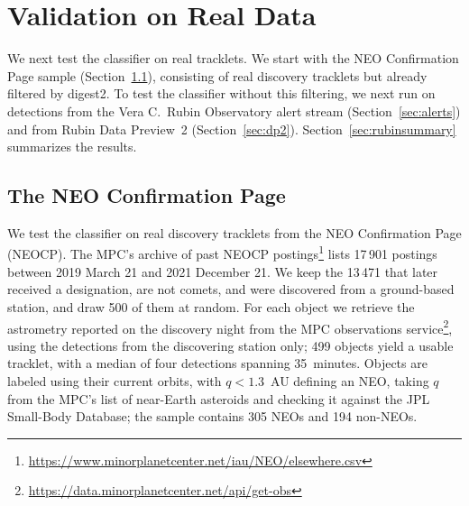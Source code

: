 \documentclass[linenumbers,twocolumn]{aastex701}
\begin{document}

\section{Validation on Real Data}
\label{sec:realdata}

We next test the classifier on real tracklets. We start with the NEO Confirmation Page sample (Section~\ref{sec:neocp}), consisting of real discovery tracklets but already filtered by digest2. To test the classifier without this
filtering, we next run on detections from the Vera C.\ Rubin Observatory alert stream (Section~\ref{sec:alerts}) and from Rubin Data Preview~2
(Section~\ref{sec:dp2}). Section~\ref{sec:rubinsummary} summarizes the
results.

\subsection{The NEO Confirmation Page}
\label{sec:neocp}

We test the classifier on real discovery tracklets from the NEO Confirmation Page
(NEOCP). The MPC's archive of past NEOCP postings\footnote{\url{https://www.minorplanetcenter.net/iau/NEO/elsewhere.csv}}
lists 17\,901 postings between 2019 March 21 and 2021 December 21. We keep
the 13\,471 that later received a designation, are not comets, and were
discovered from a ground-based station, and draw 500 of them at random. For
each object we retrieve the astrometry reported on the discovery night from
the MPC observations service\footnote{\url{https://data.minorplanetcenter.net/api/get-obs}},
using the detections from the discovering station only; 499 objects yield a
usable tracklet, with a median of four detections spanning 35~minutes.
Objects are labeled using their current orbits, with $q<1.3$~AU defining an
NEO, taking $q$ from the MPC's list of near-Earth asteroids and checking it
against the JPL Small-Body Database; the sample contains 305 NEOs and 194
non-NEOs.
\end{document}
